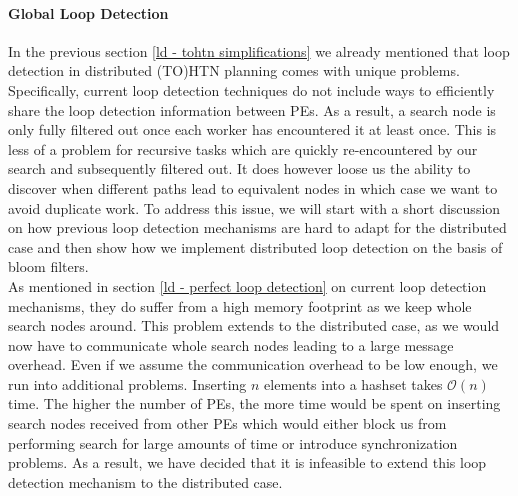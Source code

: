 \paragraph{Global Loop Detection}
In the previous section \ref{ld - tohtn simplifications} we already mentioned that loop detection in distributed (TO)HTN planning comes with unique problems. Specifically, current loop detection techniques do not include ways to efficiently share the loop detection information between PEs. As a result, a search node is only fully filtered out once each worker has encountered it at least once. This is less of a problem for recursive tasks which are quickly re-encountered by our search and subsequently filtered out. It does however loose us the ability to discover when different paths lead to equivalent nodes in which case we want to avoid duplicate work. To address this issue, we will start with a short discussion on how previous loop detection mechanisms are hard to adapt for the distributed case and then show how we implement distributed loop detection on the basis of bloom filters. \\
As mentioned in section \ref{ld - perfect loop detection} on current loop detection mechanisms, they do suffer from a high memory footprint as we keep whole search nodes around. This problem extends to the distributed case, as we would now have to communicate whole search nodes leading to a large message overhead. Even if we assume the communication overhead to be low enough, we run into additional problems. Inserting $n$ elements into a hashset takes $\mathcal{O}(n)$ time. The higher the number of PEs, the more time would be spent on inserting search nodes received from other PEs which would either block us from performing search for large amounts of time or introduce synchronization problems. As a result, we have decided that it is infeasible to extend this loop detection mechanism to the distributed case. \\
\begin{comment}
- insertion of $n$ search nodes is expensive
- encoding and decoding becomes more difficult, especially


- previous section \ref{ld - tohtn simplifications} mentions that distributed planning makes loop detection less efficient
- recursion is still fine
- different paths leading to equivalent nodes are no longer detected

- normal loop detection gets worse in distributed (TO)HTN planning
- each worker tracks it's own set of known nodes
- if worker $w_1$ encounters a node, workers $w_2, \ldots, w_n$ will not filter that node out until they've encountered it themselves at least once

- we try to find a way to perform global loop detection
\end{comment}
